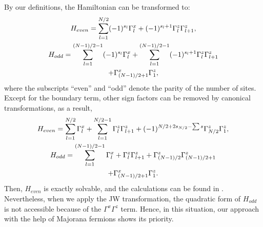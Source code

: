\documentclass[twocolumn,floats,superscriptaddress]{revtex4}
\begin{document}
 {By our definitions, the Hamiltonian can be transformed to:
\begin{gather}
H_{even}=\sum_{l=1}^{N/2}(-1)^{s_l}\Gamma_{l}^x+(-1)^{s_l+1}\Gamma_{l}^z\Gamma_{l+1}^z,\notag
\\
H_{odd}=\sum_{l=1}^{(N-1)/2-1}(-1)^{s_l}\Gamma_{l}^x+\sum_{l=1}^{(N-1)/2-1}(-1)^{s_l+1}\Gamma_{l}^z\Gamma_{l+1}^z\\ \notag
+\Gamma_{(N-1)/2+1}^x\Gamma_{1}^z,
\label{gammah}
\end{gather}
where the subscripts ``even'' and ``odd'' denote the parity of the number of sites. Except for the boundary term, other sign factors can be removed by canonical transformations, as a result,
\begin{gather}
H_{even}=\sum_{l=1}^{N/2}\Gamma_{l}^x+\sum_{l=1}^{N/2-1}\Gamma_{l}^z\Gamma_{l+1}^z+(-1)^{N/2+2s_{N/2}-\sum s}\Gamma_{N/2}^z\Gamma_{1}^z,\notag
\\
H_{odd}=\sum_{l=1}^{(N-1)/2-1}\Gamma_{l}^x+\Gamma_{l}^z\Gamma_{l+1}^z+\Gamma_{(N-1)/2}^z\Gamma_{(N-1)/2+1}^z\\ \notag
+\Gamma_{(N-1)/2+1}^x\Gamma_{1}^z.
\label{gammah}
\end{gather}
 Then, $H_{even}$ is exactly solvable, and the calculations can be found in \cite{Brzezicki2007}. Nevertheless, when we apply the JW transformation, the quadratic form of $H_{odd}$ is not accessible because of the $\Gamma^x\Gamma^z$ term. Hence, in this situation, our approach with the help of Majorana fermions shows its priority.}
\end{document}
